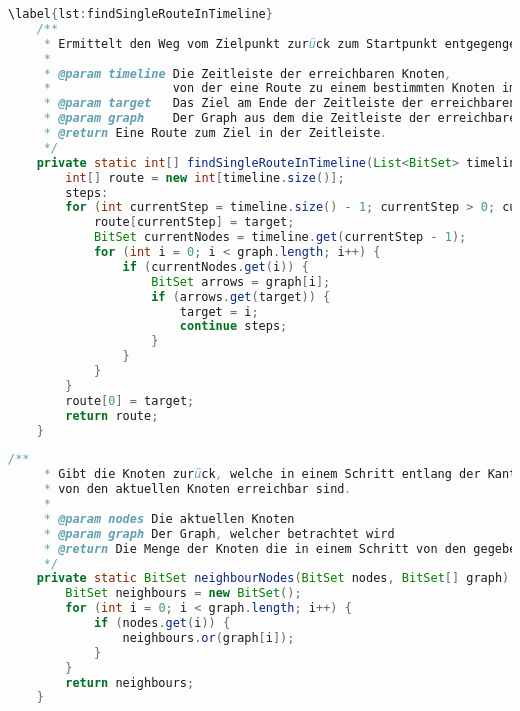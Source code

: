 \documentclass[a4paper,10pt,ngerman]{scrartcl}
\begin{document}
    \begin{lstlisting}[frame=single,language=Java,title=Methode findSingleRouteInTimeline,breaklines=true]
    \label{lst:findSingleRouteInTimeline}
    /**
     * Ermittelt den Weg vom Zielpunkt zurück zum Startpunkt entgegengesetzt der Kantenrichtung des Graphen.
     *
     * @param timeline Die Zeitleiste der erreichbaren Knoten,
     *                 von der eine Route zu einem bestimmten Knoten im letzten Zeitpunkt der Zeitleiste gebaut werden soll.
     * @param target   Das Ziel am Ende der Zeitleiste der erreichbaren Knoten, zudem eine Route gebaut werden soll.
     * @param graph    Der Graph aus dem die Zeitleiste der erreichbaren Knoten (und dementsprechend auch das Ziel) stammt.
     * @return Eine Route zum Ziel in der Zeitleiste.
     */
    private static int[] findSingleRouteInTimeline(List<BitSet> timeline, int target, BitSet[] graph) {
        int[] route = new int[timeline.size()];
        steps:
        for (int currentStep = timeline.size() - 1; currentStep > 0; currentStep--) {
            route[currentStep] = target;
            BitSet currentNodes = timeline.get(currentStep - 1);
            for (int i = 0; i < graph.length; i++) {
                if (currentNodes.get(i)) {
                    BitSet arrows = graph[i];
                    if (arrows.get(target)) {
                        target = i;
                        continue steps;
                    }
                }
            }
        }
        route[0] = target;
        return route;
    }
    \end{lstlisting}


    \begin{lstlisting}[frame=single,language=Java,title=Methode neighbourNodes,breaklines=true]
    /**
     * Gibt die Knoten zurück, welche in einem Schritt entlang der Kantenrichtung,
     * von den aktuellen Knoten erreichbar sind.
     *
     * @param nodes Die aktuellen Knoten
     * @param graph Der Graph, welcher betrachtet wird
     * @return Die Menge der Knoten die in einem Schritt von den gegebenen Knoten erreichbar ist
     */
    private static BitSet neighbourNodes(BitSet nodes, BitSet[] graph) {
        BitSet neighbours = new BitSet();
        for (int i = 0; i < graph.length; i++) {
            if (nodes.get(i)) {
                neighbours.or(graph[i]);
            }
        }
        return neighbours;
    }
    \end{lstlisting}
\end{document}
